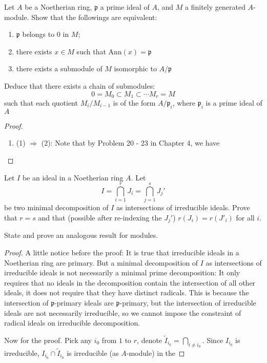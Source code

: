 \documentclass{solution}
\begin{document}
\begin{problem}
    Let $A$ be a Noetherian ring, $\mathfrak{p}$ a prime ideal of $A$, and $M$ a finitely generated $A$-module. Show that the followings are equivalent:
    \begin{enumerate}
        \item $\mathfrak{p}$ belongs to $0$ in $M$;
        \item there exists $x \in M$ such that $\mathrm{Ann}(x) = \mathfrak{p}$
        \item there exists a submodule of $M$ isomorphic to $A / \mathfrak{p}$
    \end{enumerate}
    Deduce that there exists a chain of submodules:
    $$0 = M_0 \subset M_1 \subset \cdots M_r = M$$
    such that each quotient $M_i / M_{i - 1}$ is of the form $A / \mathfrak{p}_i$, where $\mathfrak{p}_i$ is a prime ideal of $A$
\end{problem}

\begin{proof}
    \begin{enumerate}
        \item (1) $\Rightarrow$ (2): Note that by Problem 20 - 23 in Chapter 4, we have \TODO
    \end{enumerate}
\end{proof}

\begin{problem}
    Let $I$ be an ideal in a Noetherian ring $A$. Let
    $$I = \bigcap\limits_{i = 1}^{r} J_i = \bigcap\limits_{j = 1}^{s} J_j'$$
    be two minimal decomposition of $I$ as intersections of irreducible ideals. Prove that $r = s$ and that (possible after re-indexing the $J_j'$) $r(J_i) = r(J'_i)$ for all $i$.

    State and prove an analogous result for modules.
\end{problem}

\begin{proof}
    {\color{red} A little notice before the proof: It is true that irreducible ideals in a Noetherian ring are primary. But a minimal decomposition of $I$ as intersections of irreducible ideals is not necessarily a minimal prime decomposition: It only requires that no ideals in the decomposition contain the intersection of all other ideals, it does not require that they have distinct radicals. This is because the intersection of $\mathfrak{p}$-primary ideals are $\mathfrak{p}$-primary, but the intersection of irreducible ideals are not necessarily irreducible, so we cannot impose the constraint of radical ideals on irreducible decomposition.}

    Now for the proof. Pick any $i_0$ from $1$ to $r$, denote $\tilde{I}_{i_0} = \bigcap\limits_{i \ne i_0}$. Since $I_{i_0}$ is irreducible, $I_{i_0} \cap \tilde{I}_{i_0}$ is irreducible (as $A$-module) in the 
\end{proof}
\end{document}
